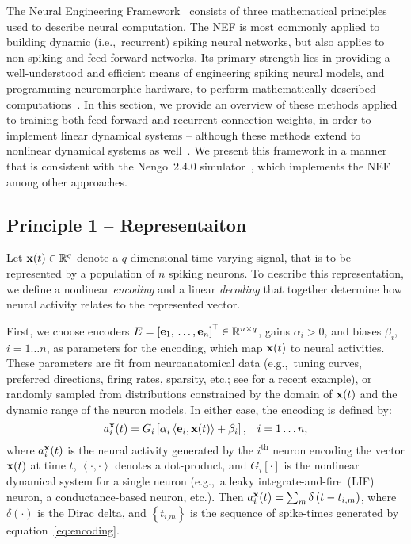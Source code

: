 The Neural Engineering Framework~\citep[NEF;][]{eliasmith1999developing, eliasmith2003a} consists of three mathematical principles used to describe neural computation.
The NEF is most commonly applied to building dynamic (i.e.,~recurrent) spiking neural networks, but also applies to non-spiking and feed-forward networks.
Its primary strength lies in providing a well-understood and efficient means of engineering spiking neural models, and programming neuromorphic hardware, to perform mathematically described computations~\citep{eliasmith2013build, boahen2017neuromorph}.
In this section, we provide an overview of these methods applied to training both feed-forward and recurrent connection weights, in order to implement linear dynamical systems -- although these methods extend to nonlinear dynamical systems as well~\citep{voelker2017iscas, voelker2017neuromorphic}.
We present this framework in a manner that is consistent with the Nengo~2.4.0 simulator~\citep{bekolay2013}, which implements the NEF among other approaches.

\subsection{Principle 1 -- Representaiton}
\label{sec:principle1}

Let $\mathbf{x}(t) \in \mathbb{R}^q$ denote a $q$-dimensional time-varying signal, that is to be represented by a population of $n$ spiking neurons.
To describe this representation, we define a nonlinear \emph{encoding} and a linear \emph{decoding} that together determine how neural activity relates to the represented vector.

First, we choose encoders $E = {\left[ \mathbf{e}_1\text{,}\, \ldots\text{,}\, \mathbf{e}_n \right]}^\mathsf{T} \in \mathbb{R}^{n \times q}$, gains $\alpha_i > 0$, and biases $\beta_i$, $i = 1 \ldots n$, as parameters for the encoding, which map $\mathbf{x}(t)$ to neural activities.
These parameters are fit from neuroanatomical data (e.g.,~tuning curves, preferred directions, firing rates, sparsity, etc.; see \citet{voelker2016a} for a recent example), or randomly sampled from distributions constrained by the domain of $\mathbf{x}(t)$ and the dynamic range of the neuron models.
In either case, the encoding is defined by:
\begin{equation} \label{eq:encoding}
a_i^{\mathbf{x}}(t) = G_i \left[ \alpha_i \left\langle \mathbf{e}_i, \mathbf{x}(t) \right\rangle + \beta_i \right] \text{,} \quad i = 1 \ldots n \text{,}
\end{equation}
where $a_i^{\mathbf{x}}(t)$ is the neural activity generated by the $i^{\text{th}}$ neuron encoding the vector $\mathbf{x}(t)$ at time $t$, $\left\langle \cdot , \cdot \right\rangle$ denotes a dot-product, and $G_i[\cdot]$ is the nonlinear dynamical system for a single neuron (e.g.,~a leaky integrate-and-fire~(LIF) neuron, a conductance-based neuron, etc.).
Then $a_i^{\mathbf{x}}(t) = \sum_m \delta \left(t - t_{i\text{,}m} \right)$, where $\delta(\cdot)$ is the Dirac delta, and $\left\{ t_{i\text{,}m} \right\}$ is the sequence of spike-times generated by equation~\ref{eq:encoding}. %

